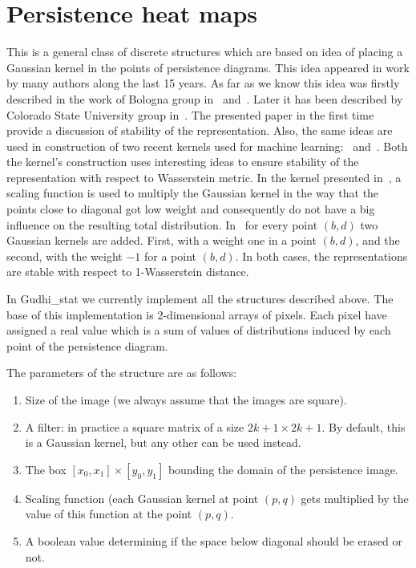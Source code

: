 \documentclass[11pt]{article}
\begin{document}
\section{Persistence heat maps}
This is a general class of discrete structures which are based on idea of placing a Gaussian kernel in the points of persistence diagrams. This idea appeared in work by many authors along the last 15 years. As far as we know this idea was firstly described in the work of Bologna group in~\cite{bologna1} and~\cite{bologna2}. Later it has been described by Colorado State University group in~\cite{Henry}. The presented paper in the first time provide a discussion of stability of the representation. Also, the same ideas are used in construction of two recent kernels used for machine learning:~\cite{yasu} and~\cite{uli}. Both the kernel's construction uses interesting ideas to ensure stability of the representation with respect to Wasserstein metric. In the kernel presented in~\cite{yasu}, a scaling function is used to multiply the Gaussian kernel in the way that the points close to diagonal got low weight and consequently do not have a big influence on the resulting total distribution. In~\cite{uli} for every point $(b,d)$ two Gaussian kernels are added. First, with a weight one in a point $(b,d)$, and the second, with the weight $-1$ for a point $(b,d)$. In both cases, the representations are stable with respect to 1-Wasserstein distance.

In Gudhi\_stat we currently implement all the structures described above. The base of this implementation is 2-dimensional arrays of pixels. Each pixel have assigned a real value which is a sum of values of distributions induced by each point of the persistence diagram. 

The parameters of the structure are as follows:
\begin{enumerate}
\item Size of the image (we always assume that the images are square).
\item A filter: in practice a square matrix of a size $2k+1 \times 2k+1$. By default, this is a Gaussian kernel, but any other can be used instead.
\item The box $[x_0,x_1]\times [y_0,y_1]$ bounding the domain of the persistence image. 
\item Scaling function (each Gaussian kernel at point $(p,q)$ gets multiplied by the value of this function at the point $(p,q)$. 
\item A boolean value determining if the space below diagonal should be erased or not. 
\end{enumerate}
\end{document}
